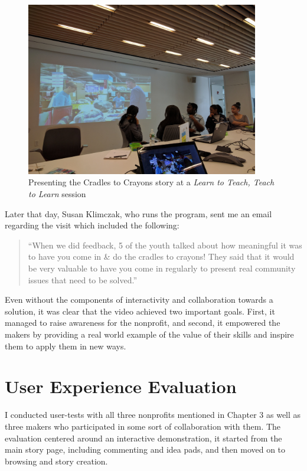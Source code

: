    \begin{figure}[thpb]
      \centering
      \includegraphics[width=4in]{figures/learn2teach.jpg}
      \caption{Presenting the Cradles to Crayons story at a \textit{Learn to Teach, Teach to Learn} session}
      \label{fig_setc}
   \end{figure}

Later that day, Susan Klimczak, who runs the program, sent me an email regarding the visit which included the following:

\begin{quotation}

``When we did feedback, 5 of the youth talked about how meaningful it was to have you come in \& do the cradles to crayons! They said that it would be very valuable to have you come in regularly to present real community issues that need to be solved.''

\end{quotation}

Even without the components of interactivity and collaboration towards a solution, it was clear that the video achieved two important goals. First, it managed to raise awareness for the nonprofit, and second, it empowered the makers by providing a real world example of the value of their skills and inspire them to apply them in new ways.

\section{User Experience Evaluation}

I conducted user-tests with all three nonprofits mentioned in Chapter 3 as well as three makers who participated in some sort of collaboration with them. The evaluation centered around an interactive demonstration, it started from the main story page, including commenting and idea pads, and then moved on to browsing and story creation. 

